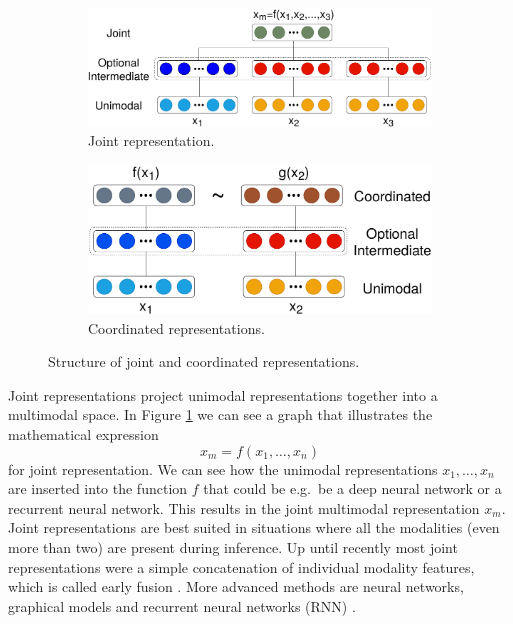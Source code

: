 \documentclass{article}
\begin{document}
\begin{figure}[H]
	\centering
	\begin{subfigure}[b]{0.54\linewidth}
		\includegraphics[width=\linewidth]{joint_reps.pdf}
		\caption{Joint representation.}
		\label{fig:reps1}	
	\end{subfigure}
	\begin{subfigure}[b]{0.43\linewidth}
		\includegraphics[width=\linewidth]{coordinated_reps.pdf}
		\caption{Coordinated representations.}
		\label{fig:reps2}	
	\end{subfigure}
	\caption{Structure of joint and coordinated representations.}
	\label{fig:reps}
\end{figure}

Joint representations project unimodal representations together into a multimodal space. In Figure \ref{fig:reps1} we can see a graph that illustrates the mathematical expression
\begin{equation}
x_m = f(x_1, \dots , x_n)
\end{equation}
for joint representation. We can see how the unimodal representations $x_1, \dots , x_n$ are inserted into the function $f$ that could be e.g.\ be a deep neural network or a recurrent neural network. This results in the joint multimodal representation $x_m$.
Joint representations are best suited in situations where all the modalities (even more than two) are present during inference. Up until recently most joint representations were a simple concatenation of individual modality features, which is called early fusion \citep{dmello2015review}. More advanced methods are neural networks, graphical models and recurrent neural networks (RNN) \citep{elman1990finding}.
\end{document}
